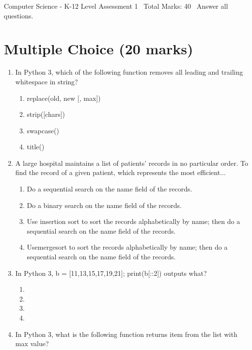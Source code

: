\documentclass[12pt]{article}
\begin{document}
\begin{center}
Computer Science - K-12 Level Assessment 1 \
Total Marks: 40 \
Answer all questions.
\end{center}

\section*{Multiple Choice (20 marks)}
\begin{enumerate}[label=\arabic*.]
\item In Python 3, which of the following function removes all leading and trailing whitespace in string?
\begin{enumerate}[label=(\alph*)]
    \item replace(old, new [, max])
    \item strip([chars])
    \item swapcase()
    \item title()
\end{enumerate}
\item A large hospital maintains a list of patients' records in no particular order. To find the record of a given patient, which represents the most efficient...
\begin{enumerate}[label=(\alph*)]
    \item Do a sequential search on the name field of the records.
    \item Do a binary search on the name field of the records.
    \item Use insertion sort to sort the records alphabetically by name; then do a sequential search on the name field of the records.
    \item Usemergesort to sort the records alphabetically by name; then do a sequential search on the name field of the records.
\end{enumerate}
\item In Python 3, b = [11,13,15,17,19,21]; print(b[::2]) outputs what?
\begin{enumerate}[label=(\alph*)]
    \item [19,21]
    \item [11,15]
    \item [11,15,19]
    \item [13,17,21]
\end{enumerate}
\item In Python 3, what is the following function returns item from the list with max value?
\begin{enumerate}[label=(\alph*)]

\end{enumerate}
\end{enumerate}
\end{document}
